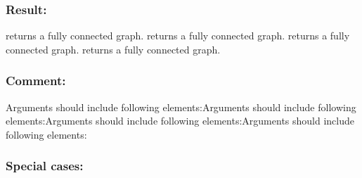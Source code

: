 \documentclass[]{book}
\theoremstyle{definition}
\theoremstyle{definition}
\theoremstyle{definition}
\theoremstyle{remark}
\begin{document}
\subsubsection{Result:}\label{result-181}

returns a fully connected graph. returns a fully connected graph.
returns a fully connected graph. returns a fully connected graph.

\subsubsection{Comment:}\label{comment-41}

Arguments should include following elements:Arguments should include
following elements:Arguments should include following elements:Arguments
should include following elements:

\subsubsection{Special cases:}\label{special-cases-68}
\end{document}
